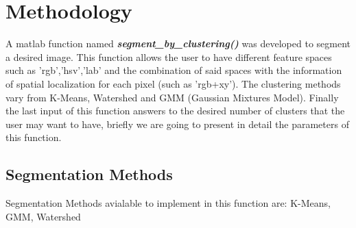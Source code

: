 \documentclass[10pt,twocolumn,letterpaper]{article}
\begin{document}
\section{Methodology}
A matlab function named \textbf{\textit{segment\_by\_clustering()}} was developed to segment a desired image. This function allows the user to have different feature spaces such as 'rgb','hsv','lab' and the combination of said spaces with the information of spatial localization for each pixel (such as 'rgb+xy'). The clustering methods vary from K-Means, Watershed and GMM (Gaussian Mixtures Model). Finally the last input of this function  answers to the desired number of clusters that the user may want to have, briefly we are going to present in detail the parameters of this function.

\subsection{Segmentation Methods}
Segmentation Methods avialable to implement in this function are: K-Means, GMM, Watershed
\end{document}
